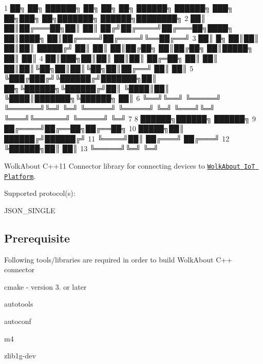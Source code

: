 
\begin{DoxyCode}
1 ██╗    ██╗ ██████╗ ██╗     ██╗  ██╗ ██████╗ ██████╗ ███╗   ██╗███╗   ██╗███████╗ ██████╗████████╗
2 ██║    ██║██╔═══██╗██║     ██║ ██╔╝██╔════╝██╔═══██╗████╗  ██║████╗  ██║██╔════╝██╔════╝╚══██╔══╝
3 ██║ █╗ ██║██║   ██║██║     █████╔╝ ██║     ██║   ██║██╔██╗ ██║██╔██╗ ██║█████╗  ██║        ██║   
4 ██║███╗██║██║   ██║██║     ██╔═██╗ ██║     ██║   ██║██║╚██╗██║██║╚██╗██║██╔══╝  ██║        ██║   
5 ╚███╔███╔╝╚██████╔╝███████╗██║  ██╗╚██████╗╚██████╔╝██║ ╚████║██║ ╚████║███████╗╚██████╗   ██║   
6  ╚══╝╚══╝  ╚═════╝ ╚══════╝╚═╝  ╚═╝ ╚═════╝ ╚═════╝ ╚═╝  ╚═══╝╚═╝  ╚═══╝╚══════╝ ╚═════╝   ╚═╝   
7 
8                                                                           ██████╗██████╗ ██████╗ 
9                                                                          ██╔════╝██╔══██╗██╔══██╗
10                                                                    █████╗██║     ██████╔╝██████╔╝
11                                                                    ╚════╝██║     ██╔═══╝ ██╔═══╝ 
12                                                                          ╚██████╗██║     ██║     
13                                                                           ╚═════╝╚═╝     ╚═╝     
\end{DoxyCode}


 Wolk\+About C++11 Connector library for connecting devices to \href{https://demo.wolkabout.com/#/login}{\tt Wolk\+About IoT Platform}.

Supported protocol(s)\+:
\begin{DoxyItemize}
\item J\+S\+O\+N\+\_\+\+S\+I\+N\+G\+LE
\end{DoxyItemize}

\subsection*{Prerequisite }

Following tools/libraries are required in order to build Wolk\+About C++ connector


\begin{DoxyItemize}
\item cmake -\/ version 3. or later
\item autotools
\item autoconf
\item m4
\item zlib1g-\/dev
\end{DoxyItemize}

